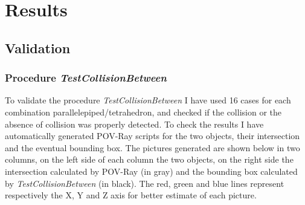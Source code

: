\documentclass[12pt, a4paper]{article}
\begin{document}
\section{Results}

\subsection{Validation}

\subsubsection{Procedure {\em TestCollisionBetween}}

To validate the procedure {\em TestCollisionBetween} I have used 16 cases for each combination parallelepiped/tetrahedron, and checked if the collision or the absence of collision was properly detected. To check the results I have automatically generated POV-Ray scripts for the two objects, their intersection and the eventual bounding box. The pictures generated are shown below in two columns, on the left side of each column the two objects, on the right side the intersection calculated by POV-Ray (in gray) and the bounding box calculated by {\em TestCollisionBetween} (in black). The red, green and blue lines represent respectively the X, Y and Z axis for better estimate of each picture.\\
\end{document}
